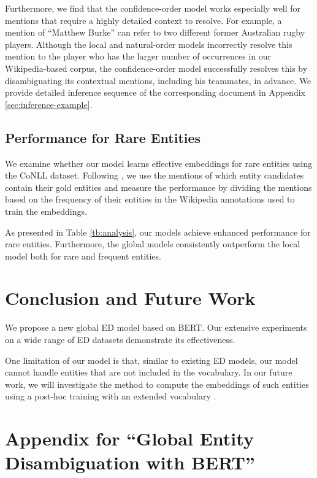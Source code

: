\documentclass[11pt]{article}
\begin{document}
Furthermore, we find that the confidence-order model works especially well for mentions that require a highly detailed context to resolve.
For example, a mention of ``Matthew Burke'' can refer to two different former Australian rugby players.
Although the local and natural-order models incorrectly resolve this mention to the player who has the larger number of occurrences in our Wikipedia-based corpus, the confidence-order model successfully resolves this by disambiguating its contextual mentions, including his teammates, in advance.
We provide detailed inference sequence of the corresponding document in Appendix \ref{sec:inference-example}.

\subsection{Performance for Rare Entities}
We examine whether our model learns effective embeddings for rare entities using the CoNLL dataset.
Following , we use the mentions of which entity candidates contain their gold entities and measure the performance by dividing the mentions based on the frequency of their entities in the Wikipedia annotations used to train the embeddings.

As presented in Table \ref{tb:analysis}, our models achieve enhanced performance for rare entities.
Furthermore, the global models consistently outperform the local model both for rare and frequent entities.

\section{Conclusion and Future Work}
We propose a new global ED model based on BERT.
Our extensive experiments on a wide range of ED datasets demonstrate its effectiveness.

One limitation of our model is that, similar to existing ED models, our model cannot handle entities that are not included in the vocabulary.
In our future work, we will investigate the method to compute the embeddings of such entities using a post-hoc training with an extended vocabulary \cite{tai-etal-2020-exbert}.    




\clearpage
\appendix

\section*{Appendix for ``Global Entity Disambiguation with BERT''}
\end{document}
